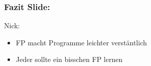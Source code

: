 \documentclass[compress, blue]{beamer}
\begin{document}




\begin{frame}\frametitle{Fazit Slide:}
  \begin{block}{Nick:}
    \begin{itemize}
    \item FP macht Programme leichter verstäntlich
    \item Jeder sollte ein bisschen FP lernen
    \end{itemize}
  \end{block}
\end{frame}
\end{document}
